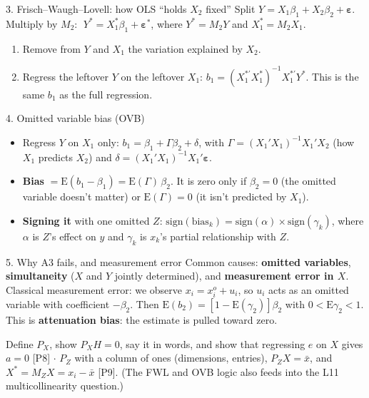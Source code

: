 \documentclass[10pt]{article}
\newcommand{\E}{\mathrm{E}}
\newcommand{\veps}{\bm{\varepsilon}}
\begin{document}
\begin{topic}{3. Frisch--Waugh--Lovell: how OLS ``holds $X_2$ fixed''}
Split $Y=X_1\beta_1+X_2\beta_2+\veps$. Multiply by $M_2$: $\;Y^*=X_1^*\beta_1+\veps^*$, where $Y^*=M_2Y$ and $X_1^*=M_2X_1$.
\begin{enumerate}
\item Remove from $Y$ and $X_1$ the variation explained by $X_2$.
\item Regress the leftover $Y$ on the leftover $X_1$: $b_1=(X_1^{*\prime}X_1^*)^{-1}X_1^{*\prime}Y^*$. This is the same $b_1$ as the full regression.
\end{enumerate}
\end{topic}

\begin{topic}{4. Omitted variable bias (OVB)}
\begin{itemize}
\item Regress $Y$ on $X_1$ only: $b_1=\beta_1+\Gamma\beta_2+\delta$, with $\Gamma=(X_1'X_1)^{-1}X_1'X_2$ (how $X_1$ predicts $X_2$) and $\delta=(X_1'X_1)^{-1}X_1'\veps$.
\item \textbf{Bias} $=\E(b_1-\beta_1)=\E(\Gamma)\,\beta_2$. It is zero only if $\beta_2=0$ (the omitted variable doesn't matter) or $\E(\Gamma)=0$ (it isn't predicted by $X_1$).
\item \textbf{Signing it} with one omitted $Z$: $\mathrm{sign}(\text{bias}_k)=\mathrm{sign}(\alpha)\times\mathrm{sign}(\gamma_k)$, where $\alpha$ is $Z$'s effect on $y$ and $\gamma_k$ is $x_k$'s partial relationship with $Z$.
\end{itemize}
\end{topic}

\begin{topic}{5. Why A3 fails, and measurement error}
Common causes: \textbf{omitted variables}, \textbf{simultaneity} ($X$ and $Y$ jointly determined), and \textbf{measurement error in $X$}.
Classical measurement error: we observe $x_i=x_i^o+u_i$, so $u_i$ acts as an omitted variable with coefficient $-\beta_2$. Then $\E(b_2)=[1-\E(\gamma_2)]\beta_2$ with $0<\E\gamma_2<1$. This is \textbf{attenuation bias}: the estimate is pulled toward zero.
\end{topic}

\begin{exam}
Define $P_X$, show $P_XH=0$, say it in words, and show that regressing $e$ on $X$ gives $a=0$ [P8] $\cdot$ $P_Z$ with a column of ones (dimensions, entries), $P_ZX=\bar x$, and $X^*=M_ZX=x_i-\bar x$ [P9]. (The FWL and OVB logic also feeds into the L11 multicollinearity question.)
\end{exam}
\end{document}
